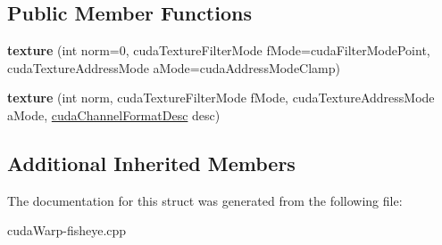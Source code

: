 \subsection*{Public Member Functions}
\begin{DoxyCompactItemize}
\item 
{\bfseries texture} (int norm=0, cuda\+Texture\+Filter\+Mode f\+Mode=cuda\+Filter\+Mode\+Point, cuda\+Texture\+Address\+Mode a\+Mode=cuda\+Address\+Mode\+Clamp)\hypertarget{structtexture_afcd1b9c811059c5518a6e6c7650d1f8a}{}\label{structtexture_afcd1b9c811059c5518a6e6c7650d1f8a}

\item 
{\bfseries texture} (int norm, cuda\+Texture\+Filter\+Mode f\+Mode, cuda\+Texture\+Address\+Mode a\+Mode, \hyperlink{structcudaChannelFormatDesc}{cuda\+Channel\+Format\+Desc} desc)\hypertarget{structtexture_aab6e443bbe8c70cf38da913e2a36d5da}{}\label{structtexture_aab6e443bbe8c70cf38da913e2a36d5da}

\end{DoxyCompactItemize}
\subsection*{Additional Inherited Members}


The documentation for this struct was generated from the following file\+:\begin{DoxyCompactItemize}
\item 
cuda\+Warp-\/fisheye.\+cpp\end{DoxyCompactItemize}
